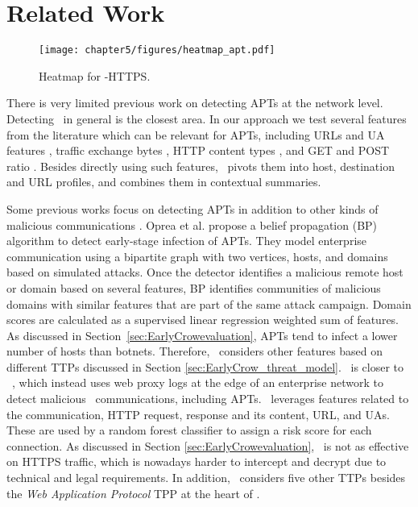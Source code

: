 \section{Related Work}
\label{sec:earlycrow-related-work}

\begin{figure*}[!t]
\centering
\texttt{[image: chapter5/figures/heatmap\_apt.pdf]}
\caption{Heatmap for \earlycrow-HTTPS.}\label{fig:heat_mao}
\end{figure*}


There is very limited previous work on detecting APTs at the network level. 
%
Detecting \cc\ in general is the closest area.
%
In our approach we test several features from the literature which can be relevant for APTs, including URLs and UA features \cite{oprea2018made,oprea2015detection,invernizzi2014nazca,perdisci2010behavioral}, traffic exchange bytes \cite{bartos2016optimized,bilge2012disclosure,tegeler2012botfinder, oprea2018made}, HTTP content types \cite{oprea2018made,oprea2015detection}, and GET and POST ratio \cite{perdisci2010behavioral,oprea2018made}. Besides directly using such features, \earlycrow\ pivots them into host, destination and URL profiles, and combines them in contextual summaries. 
%

Some previous works focus on detecting APTs in addition to other kinds of malicious communications \cite{oprea2015detection,oprea2018made}. 
%
Oprea et al. \cite{oprea2015detection} propose a belief propagation (BP) algorithm to detect early-stage infection of APTs. 
%
They model enterprise communication using a bipartite graph with two vertices, hosts, and domains based on simulated attacks.
%
Once the detector identifies a malicious remote host or domain based on several features, BP identifies communities of malicious domains with similar features that are part of the same attack campaign. 
%
Domain scores are calculated as a supervised linear regression weighted sum of features.
%
As discussed in Section~\ref{sec:EarlyCrowevaluation}, APTs tend to infect a lower number of hosts than botnets. 
%
Therefore, \earlycrow\ considers other features based on different TTPs discussed in Section \ref{sec:EarlyCrow_threat_model}. 
%
\earlycrow\ is closer to \made~\cite{oprea2018made}, which instead uses web proxy logs at the edge of an enterprise network to detect malicious \cc\ communications, including APTs. 
%
\made\ leverages features related to the communication, HTTP request, response and its content, URL, and UAs.
%
These are used by a random forest classifier to assign a risk score for each connection. 
%
As discussed in Section \ref{sec:EarlyCrowevaluation}, \made\ is not as effective on HTTPS traffic, which is nowadays harder to intercept and decrypt due to technical and legal requirements. 
%
In addition, \earlycrow\ considers five other TTPs besides the \textit{Web Application Protocol} TPP at the heart of \made. 



